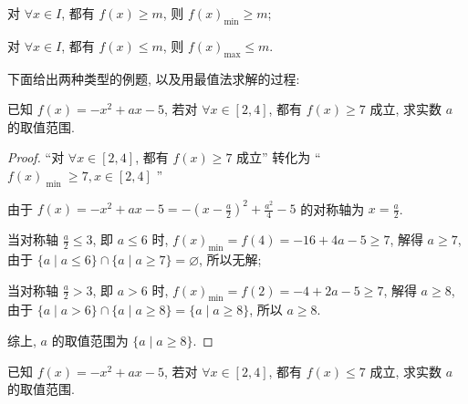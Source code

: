 \begin{type}\label{type:1}
  对 \(\forall x \in  I\), 都有 \(f(x)  \geq  m\), 则 \(f{(x) }_{\min } \geq  m\);
\end{type}
\begin{type}\label{type:2}
  对 \(\forall x \in  I\), 都有 \(f(x)  \leq  m\), 则 \(f{(x) }_{\max } \leq  m\).
\end{type}

下面给出两种类型的例题, 以及用最值法求解的过程:

\begin{example}\label{example:2.1.1.1}
  已知 \(f(x)  = -{x}^{2} + {ax}-5\), 若对 \(\forall x \in  \left\lbrack  {2, 4}\right\rbrack\), 都有 \(f(x)  \geq  7\) 成立, 求实数 \(a\) 的取值范围.
\end{example}

\begin{proof}
  “对 \(\forall x \in  \left\lbrack  {2, 4}\right\rbrack\), 都有 \(f(x)  \geq  7\) 成立” 转化为 “ \(f{(x) }_{\text{ min }} \geq  7, x \in  \left\lbrack  {2, 4}\right\rbrack\) ”

由于 \(f(x)  = -{x}^{2} + {ax}-5 = -{\left( x-\frac{a}{2}\right) }^{2} + \frac{{a}^{2}}{4}-5\) 的对称轴为 \(x = \frac{a}{2}\).

当对称轴 \(\frac{a}{2} \leq  3\), 即 \(a \leq  6\) 时, \(f{(x) }_{\min } = f\left( 4\right)  = -{16} + {4a}-5 \geq  7\), 解得 \(a \geq  7\), 由于 \(\{ a \mid  a \leq  6\}  \cap  \{ a \mid  a \geq  7\}  = \varnothing\), 所以无解;

当对称轴 \(\frac{a}{2} > 3\), 即 \(a > 6\) 时, \(f{(x) }_{\min } = f\left( 2\right)  = -4 + {2a}-5 \geq  7\), 解得 \(a \geq  8\), 由于 \(\{ a \mid  a > 6\}  \cap  \{ a \mid  a \geq  8\}  = \{ a \mid  a \geq  8\}\), 所以 \(a \geq  8\).

综上, \(a\) 的取值范围为 \(\{ a \mid  a \geq  8\}\).
\end{proof}

\begin{variation}
  已知 \(f(x)  = -{x}^{2} + {ax}-5\), 若对 \(\forall x \in  \left\lbrack  {2, 4}\right\rbrack\), 都有 \(f(x)  \leq  7\) 成立, 求实数 \(a\) 的取值范围.
\end{variation}


